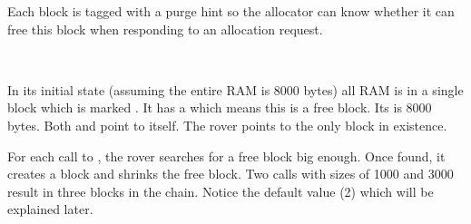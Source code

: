 Each block is tagged with a purge hint so the allocator can know whether it can free this block when responding to an allocation request.\\
\par
{}\\
\par
In its initial state (assuming the entire RAM is 8000 bytes) all RAM is in a single block which is marked . It has a   which means this is a free block. Its  is 8000 bytes. Both  and  point to itself. The rover points to the only block in existence.\\
\par
{}
\par
For each call to , the rover searches for a free block big enough. Once found, it creates a block and shrinks the free block. Two calls with sizes of 1000 and 3000 result in three blocks in the chain. Notice the default  value (2) which will be explained later.\\
\par
{}

